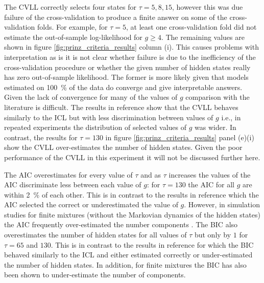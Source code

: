 The CVLL correctly selects four states for $\tau = 5, 8, 15$, however this was due failure of the cross-validation to produce a finite answer on some of the cross-validation folds. For example, for $\tau=5$, at least one cross-validation fold did not estimate the out-of-sample log-likelihood for $g\ge 4$. The remaining values are shown in figure \ref{fig:prinz_criteria_results} column (i). This causes problems with interpretation as is it is not clear whether failure is due to the  inefficiency of the cross-validation procedure or whether the given number of hidden states really has zero out-of-sample likelihood. The former is more likely given that models estimated on \SI{100}{\percent} of the data do converge and give interpretable answers. Given the lack of convergence for many of the values of $g$ comparison with the literature is difficult. The results in reference \cite{celeuxSelectingHiddenMarkov2008} show that the CVLL behaves similarly to the ICL but with less discrimination between values of $g$ i.e., in repeated experiments the distribution of selected values of $g$ was wider. In contrast, the results for $\tau=130$ in figure \ref{fig:prinz_criteria_results} panel (e)(i) show the CVLL over-estimates the number of hidden states.  Given the poor performance of the CVLL in this experiment it will not be discussed further here. 

The AIC overestimates for every value of $\tau$ and as $\tau$ increases the values of the AIC discriminate less between each value of $g$: for $\tau = 130$ the AIC for all $g$ are within \SI{2}{\percent} of each other. This is in contrast to the results in reference \cite{celeuxSelectingHiddenMarkov2008} which the AIC selected the correct or underestimated the value of $g$. However, in simulation studies for finite mixtures (without the Markovian dynamics of the hidden states) the AIC frequently over-estimated the number components \cite{celeuxEntropyCriterionAssessing1996, soromenho1994comparing}. The BIC also overestimates the number of hidden states for all values of $\tau$ but only by $1$ for $\tau=65$ and $130$. This is in contrast to the results in reference  \cite{celeuxSelectingHiddenMarkov2008} for which the BIC behaved similarly to the ICL and either estimated correctly or under-estimated the number of hidden states.  In addition, for finite mixtures the BIC has also been shown to under-estimate the number of components\cite{biernackiAssessingMixtureModel2000a}.

